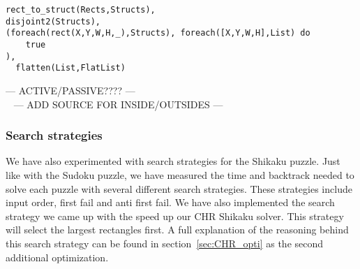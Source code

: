 \begin{lstlisting}
rect_to_struct(Rects,Structs),
disjoint2(Structs),
(foreach(rect(X,Y,W,H,_),Structs), foreach([X,Y,W,H],List) do
  	true
),
  flatten(List,FlatList)
\end{lstlisting}
--- ACTIVE/PASSIVE???? --- \\\
--- ADD SOURCE FOR INSIDE/OUTSIDES ---
\subsubsection{Search strategies}
We have also experimented with search strategies for the Shikaku puzzle. Just like with the Sudoku puzzle, we have measured the time and backtrack needed to solve each puzzle with several different search strategies. These strategies include input order, first fail and anti first fail. We have also implemented the search strategy we came up with the speed up our CHR Shikaku solver. This strategy will select the largest rectangles first. A full explanation of the reasoning behind this search strategy can be found in section~\ref{sec:CHR_opti} as the second additional optimization.

